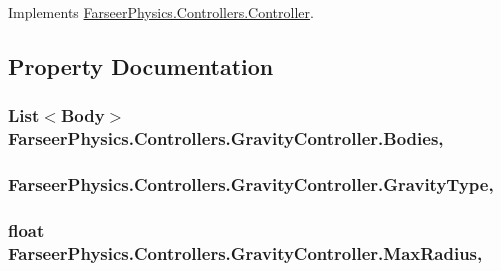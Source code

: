Implements \hyperlink{class_farseer_physics_1_1_controllers_1_1_controller_a1aff9a8d046a6e511d900d5eb354f3ea}{Farseer\+Physics.\+Controllers.\+Controller}.



\subsection{Property Documentation}
\hypertarget{class_farseer_physics_1_1_controllers_1_1_gravity_controller_a4a4005415b405906f9e5cd9cec1d3f85}{
\subsubsection[{Bodies}]{\setlength{\rightskip}{0pt plus 5cm}List$<${\bf Body}$>$ Farseer\+Physics.\+Controllers.\+Gravity\+Controller.\+Bodies\hspace{0.3cm}{\ttfamily [get]}, {\ttfamily [set]}}}\label{class_farseer_physics_1_1_controllers_1_1_gravity_controller_a4a4005415b405906f9e5cd9cec1d3f85}
\hypertarget{class_farseer_physics_1_1_controllers_1_1_gravity_controller_a77c6878823a58581aa7941eee7f29637}{
\subsubsection[{Gravity\+Type}]{ Farseer\+Physics.\+Controllers.\+Gravity\+Controller.\+Gravity\+Type\hspace{0.3cm}{\ttfamily [get]}, {\ttfamily [set]}}}\label{class_farseer_physics_1_1_controllers_1_1_gravity_controller_a77c6878823a58581aa7941eee7f29637}
\hypertarget{class_farseer_physics_1_1_controllers_1_1_gravity_controller_a32eb34c2a5dbdd9e6a1ea439a52e08c3}{
\subsubsection[{Max\+Radius}]{\setlength{\rightskip}{0pt plus 5cm}float Farseer\+Physics.\+Controllers.\+Gravity\+Controller.\+Max\+Radius\hspace{0.3cm}{\ttfamily [get]}, {\ttfamily [set]}}}\label{class_farseer_physics_1_1_controllers_1_1_gravity_controller_a32eb34c2a5dbdd9e6a1ea439a52e08c3}
